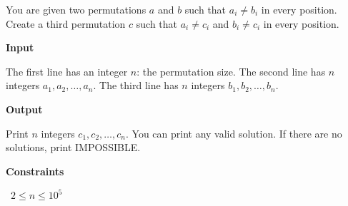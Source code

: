 You are given two permutations $a$ and $b$ such that $a_i \neq b_i$ in every position. Create a third permutation $c$ such that $a_i \neq c_i$ and $b_i \neq c_i$ in every position.

\vspace{0.3cm}\noindent\textbf{Input}

The first line has an integer $n$: the permutation size.
The second line has $n$ integers $a_1,a_2,\dots,a_n$.
The third line has $n$ integers $b_1,b_2,\dots,b_n$.

\vspace{0.3cm}\noindent\textbf{Output}

Print $n$ integers $c_1,c_2,\dots,c_n$. You can print any valid solution. If there are no solutions, print IMPOSSIBLE.

\vspace{0.3cm}\noindent\textbf{Constraints}

\textbullet\ $2 \le n \le 10^5$